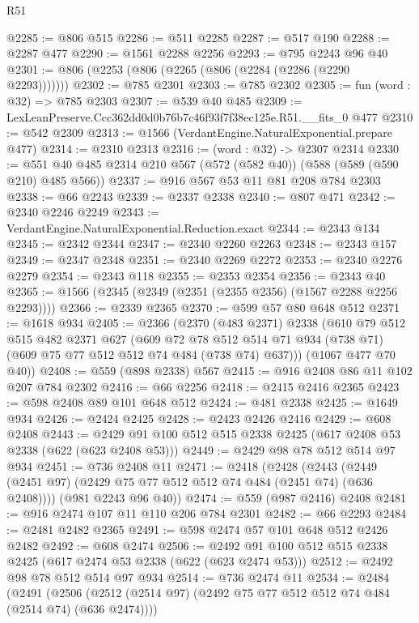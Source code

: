 \begin{lexlean}{R51}
\begin{coremodule}
@2285 := @806 @515
@2286 := @511 @2285
@2287 := @517 @190
@2288 := @2287 @477
@2290 := @1561 @2288 @2256
@2293 := @795 @2243 @96 @40
@2301 := @806 (@2253 (@806 (@2265 (@806 (@2284 (@2286 (@2290 @2293)))))))
@2302 := @785 @2301
@2303 := @785 @2302
@2305 := fun (word : @32) => @785 @2303
@2307 := @539 @40 @485
@2309 := LexLeanPreserve.Ccc362dd0d0b76b7c46f93f7f38ec125e.R51.__fits_0 @477
@2310 := @542 @2309
@2313 := @1566 (VerdantEngine.NaturalExponential.prepare @477)
@2314 := @2310 @2313
@2316 := (word : @32) -> @2307 @2314
@2330 := @551 @40 @485 @2314 @210 @567 (@572 (@582 @40)) (@588 (@589 (@590 @210) @485 @566))
@2337 := @916 @567 @53 @11 @81 @208 @784 @2303
@2338 := @66 @2243
@2339 := @2337 @2338
@2340 := @807 @471
@2342 := @2340 @2246 @2249
@2343 := VerdantEngine.NaturalExponential.Reduction.exact
@2344 := @2343 @134
@2345 := @2342 @2344
@2347 := @2340 @2260 @2263
@2348 := @2343 @157
@2349 := @2347 @2348
@2351 := @2340 @2269 @2272
@2353 := @2340 @2276 @2279
@2354 := @2343 @118
@2355 := @2353 @2354
@2356 := @2343 @40
@2365 := @1566 (@2345 (@2349 (@2351 (@2355 @2356) (@1567 @2288 @2256 @2293))))
@2366 := @2339 @2365
@2370 := @599 @57 @80 @648 @512
@2371 := @1618 @934
@2405 := @2366
    (@2370
      (@483 @2371)
      @2338
      (@610
        @79
        @512
        @515
        @482
        @2371
        @627
        (@609
          @72
          @78
          @512
          @514
          @71
          @934
          (@738 @71)
          (@609 @75 @77 @512 @512 @74 @484 (@738 @74) @637)))
      (@1067 @477 @70 @40))
@2408 := @559 (@898 @2338) @567
@2415 := @916 @2408 @86 @11 @102 @207 @784 @2302
@2416 := @66 @2256
@2418 := @2415 @2416 @2365
@2423 := @598 @2408 @89 @101 @648 @512
@2424 := @481 @2338
@2425 := @1649 @934
@2426 := @2424 @2425
@2428 := @2423 @2426 @2416
@2429 := @608 @2408
@2443 := @2429 @91 @100 @512 @515 @2338 @2425 (@617 @2408 @53 @2338 (@622 (@623 @2408 @53)))
@2449 := @2429 @98 @78 @512 @514 @97 @934
@2451 := @736 @2408 @11
@2471 := @2418
    (@2428
      (@2443 (@2449 (@2451 @97) (@2429 @75 @77 @512 @512 @74 @484 (@2451 @74) (@636 @2408))))
      (@981 @2243 @96 @40))
@2474 := @559 (@987 @2416) @2408
@2481 := @916 @2474 @107 @11 @110 @206 @784 @2301
@2482 := @66 @2293
@2484 := @2481 @2482 @2365
@2491 := @598 @2474 @57 @101 @648 @512 @2426 @2482
@2492 := @608 @2474
@2506 := @2492 @91 @100 @512 @515 @2338 @2425 (@617 @2474 @53 @2338 (@622 (@623 @2474 @53)))
@2512 := @2492 @98 @78 @512 @514 @97 @934
@2514 := @736 @2474 @11
@2534 := @2484
    (@2491
      (@2506 (@2512 (@2514 @97) (@2492 @75 @77 @512 @512 @74 @484 (@2514 @74) (@636 @2474))))

\end{coremodule}
\end{lexlean}
